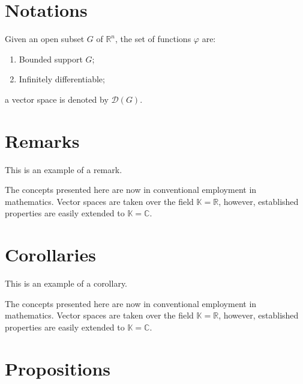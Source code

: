 \documentclass[11pt,fleqn]{book} %
\begin{document}
{%

\section{Notations}

\begin{notation}
Given an open subset $G$ of $\mathbb{R}^n$, the set of functions $\varphi$ are:
\begin{enumerate}
\item Bounded support $G$;
\item Infinitely differentiable;
\end{enumerate}
a vector space is denoted by $\mathcal{D}(G)$. 
\end{notation}


\section{Remarks}

This is an example of a remark.

\begin{remark}
The concepts presented here are now in conventional employment in mathematics. Vector spaces are taken over the field $\mathbb{K}=\mathbb{R}$, however, established properties are easily extended to $\mathbb{K}=\mathbb{C}$.
\end{remark}


\section{Corollaries}

This is an example of a corollary.

\begin{corollary}
The concepts presented here are now in conventional employment in mathematics. Vector spaces are taken over the field $\mathbb{K}=\mathbb{R}$, however, established properties are easily extended to $\mathbb{K}=\mathbb{C}$.
\end{corollary}


\section{Propositions}

}
\end{document}
